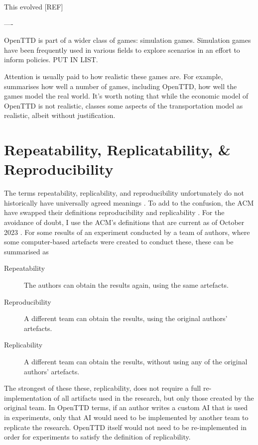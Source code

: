 \documentclass[logo,msc,dsti]{infthesis}    %
\begin{document}
This evolved [REF]

----

OpenTTD is part of a wider class of games: simulation games. Simulation games have been frequently used in various fields to explore scenarios in an effort to inform policies. PUT IN LIST.

Attention is usually paid to how realistic these games are. For example, \cite{raghothama2013review} summarises how well a number of games, including OpenTTD, how well the games model the real world. It's worth noting that while the economic model of OpenTTD is not realistic, \cite{raghothama2013review} classes some aspects of the transportation model as realistic, albeit without justification.



\section{Repeatability, Replicatability, \& Reproducibility}



The terms repeatability, replicability, and reproducibility unfortunately do not historically have universally agreed meanings \cite{plesser_reproducibility_2018}. To add to the confusion, the ACM have swapped their definitions reproducibility and replicability \cite{association_for_computing_machiner_new_2020}. For the avoidance of doubt, I use the ACM's definitions that are current as of October 2023 \cite{association_for_computing_machiner_artifact_2020}. For some results of an experiment conducted by a team of authors, where some computer-based artefacts were created to conduct these, these can be summarised as

\begin{description}
\item[Repeatability] The authors can obtain the results again, using the same artefacts.
\item[Reproducibility] A different team can obtain the results, using the original authors' artefacts.
\item[Replicability] A different team can obtain the results, without using any of the original authors' artefacts.
\end{description}

The strongest of these these, replicability, does not require a full re-implementation of all artifacts used in the research, but only those created by the original team. In OpenTTD terms, if an author writes a custom AI that is used in experiments, only that AI would need to be implemented by another team to replicate the research. OpenTTD itself would not need to be re-implemented in order for experiments to satisfy the definition of replicability.
\end{document}
